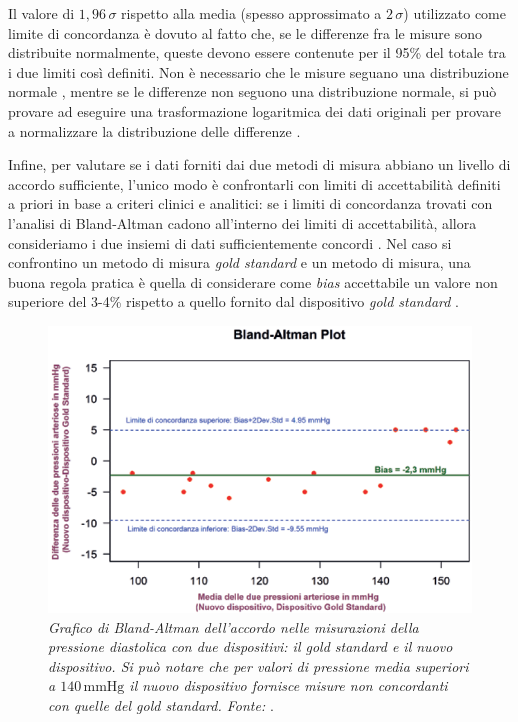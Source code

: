 Il valore di $1,96\,\sigma$ rispetto alla media (spesso approssimato a $2\,\sigma$) utilizzato come limite di concordanza è dovuto al fatto che, se le differenze fra le misure sono distribuite normalmente, queste devono essere contenute per il 95\% del totale tra i due limiti così definiti. Non è necessario che le misure seguano una distribuzione normale \cite{BlandAltman}, mentre se le differenze non seguono una distribuzione normale, si può provare ad eseguire una trasformazione logaritmica dei dati originali per provare a normalizzare la distribuzione delle differenze \cite{Giavarina2015}.

Infine, per valutare se i dati forniti dai due metodi di misura abbiano un livello di accordo sufficiente, l'unico modo è confrontarli con limiti di accettabilità definiti a priori in base a criteri clinici e analitici: se i limiti di concordanza trovati con l'analisi di Bland-Altman cadono all'interno dei limiti di accettabilità, allora consideriamo i due insiemi di dati sufficientemente concordi \cite{Giavarina2015}. Nel caso si confrontino un metodo di misura \textit{gold standard} e un metodo di misura, una buona regola pratica è quella di considerare come \textit{bias} accettabile un valore non superiore del 3-4\% rispetto a quello fornito dal dispositivo \textit{gold standard} \cite{Weinfurt2010,Franco2017}.

\begin{figure}[htp]
\centering
\includegraphics[scale=0.8]{Immagini/ba.png}
\caption{\label{fig:ba} \textit{Grafico di Bland-Altman dell'accordo nelle misurazioni della pressione diastolica con due dispositivi: il gold standard e il nuovo
dispositivo. Si può notare che per valori di pressione media superiori a $140\,\mathrm{mmHg}$ il nuovo dispositivo fornisce misure non concordanti con quelle del gold standard. Fonte:} \cite{Franco2017}.}
\end{figure}